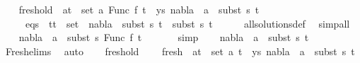 \begin{isabellebody}
\ \ \isamarkupfalse%
\ fresh{\isacharunderscore}{\kern0pt}old{\isacharcolon}{\kern0pt}\ {\isachardoublequoteopen}{\isasymforall}\ {\isacharparenleft}{\kern0pt}a{\isacharcomma}{\kern0pt}t{\isacharparenright}{\kern0pt}\ {\isasymin}\ set\ {\isacharparenleft}{\kern0pt}{\isacharparenleft}{\kern0pt}a{\isacharcomma}{\kern0pt}\ Func\ f\ t{\isacharparenright}{\kern0pt}\ {\isacharhash}{\kern0pt}\ ys{\isacharparenright}{\kern0pt}{\isachardot}{\kern0pt}\ nabla{}\ {\isasymturnstile}\ a\ {\isasymsharp}\ subst\ s{}\ t{\isachardoublequoteclose}\isanewline
\ \ \ \ \ eqs{\isacharcolon}{\kern0pt}\ {\isachardoublequoteopen}{\isasymforall}\ {\isacharparenleft}{\kern0pt}t{}{\isacharcomma}{\kern0pt}t{}{\isacharparenright}{\kern0pt}\ {\isasymin}\ set\ {\isacharbrackleft}{\kern0pt}{\isacharbrackright}{\kern0pt}{\isachardot}{\kern0pt}\ nabla{}\ {\isasymturnstile}\ subst\ s{}\ t{}\ {\isasymapprox}\ subst\ s{}\ t{}{\isachardoublequoteclose}\isanewline
\ \ \ \ \isamarkupfalse%
\ all{\isacharunderscore}{\kern0pt}solutions{\isacharunderscore}{\kern0pt}def\ \isamarkupfalse%
\ simp{\isacharunderscore}{\kern0pt}all\isanewline
\ \ \isamarkupfalse%
\ {\isachardoublequoteopen}nabla{}\ {\isasymturnstile}\ a\ {\isasymsharp}\ subst\ s{}\ {\isacharparenleft}{\kern0pt}Func\ f\ t{\isacharparenright}{\kern0pt}{\isachardoublequoteclose}\ \isanewline
\ \ \ \ \isamarkupfalse%
\ simp\isanewline
\ \ \isamarkupfalse%
\ {\isachardoublequoteopen}nabla{}\ {\isasymturnstile}\ a\ {\isasymsharp}\ subst\ s{}\ t{\isachardoublequoteclose}\ \isanewline
\ \ \ \ \isamarkupfalse%
\ Fresh{\isacharunderscore}{\kern0pt}elims{\isacharparenleft}{\kern0pt}{}{\isacharparenright}{\kern0pt}\ \isamarkupfalse%
\ auto\isanewline
\ \ \isamarkupfalse%
\ fresh{\isacharunderscore}{\kern0pt}old\ \isamarkupfalse%
\isanewline
\ \ \ fresh{\isacharcolon}{\kern0pt}\ {\isachardoublequoteopen}{\isasymforall}\ {\isacharparenleft}{\kern0pt}a{\isacharcomma}{\kern0pt}t{\isacharparenright}{\kern0pt}\ {\isasymin}\ set\ {\isacharparenleft}{\kern0pt}{\isacharparenleft}{\kern0pt}a{\isacharcomma}{\kern0pt}\ t{\isacharparenright}{\kern0pt}\ {\isacharhash}{\kern0pt}\ ys{\isacharparenright}{\kern0pt}{\isachardot}{\kern0pt}\ nabla{}\ {\isasymturnstile}\ a\ {\isasymsharp}\ subst\ s{}\ t{\isachardoublequoteclose}\isanewline

\end{isabellebody}
